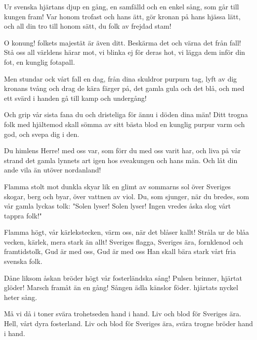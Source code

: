 \author{Text: Carl Vilhelm August Strandberg}


\songtext{}Ur svenska hjärtans djup en gång,
en samfälld och en enkel sång,
som går till kungen fram!
Var honom trofast och hans ätt,
gör kronan på hans hjässa lätt,
och all din tro till honom sätt,
du folk av frejdad stam!

O konung! folkets majestät
är även ditt. Beskärma det
och värna det från fall!
Stå oss all världens härar mot,
vi blinka ej för deras hot,
vi lägga dem inför din fot,
en kunglig fotapall.

Men stundar ock vårt fall en dag,
från dina skuldror purpurn tag,
lyft av dig kronans tvång
och drag de kära färger på,
det gamla gula och det blå,
och med ett svärd i handen gå
till kamp och undergång!

Och grip vår sista fana du
och dristeliga för ännu
i döden dina män!
Ditt trogna folk med hjältemod
skall sömma av sitt bästa blod
en kunglig purpur varm och god,
och svepa dig i den.

Du himlens Herre! med oss var,
som förr du med oss varit har,
och liva på vår strand
det gamla lynnets art igen
hos sveakungen och hans män.
Och låt din ande vila än
utöver nordanland!





\author{Text: Karl Gustav Ossiannilsson}

\songtext{}Flamma stolt mot dunkla skyar
lik en glimt av sommarns sol
över Sveriges skogar, berg och byar,
över vattnen av viol.
Du, som sjunger, när du bredes,
som vår gamla lyckas tolk:
"Solen lyser! Solen lyser!
Ingen vredes åska slog vårt tappra folk!"

Flamma högt, vår kärlekstecken,
värm oss, när det blåser kallt!
Stråla ur de blåa vecken,
kärlek, mera stark än allt!
Sveriges flagga, Sveriges ära,
fornklenod och framtidstolk,
Gud är med oss, Gud är med oss
Han skall bära stark vårt fria svenska folk.






\songtext{}Dåne liksom åskan bröder
högt vår fosterländska sång!
Pulsen brinner, hjärtat glöder!
Marsch framåt än en gång!
Sången ädla känslor föder.
hjärtats nyckel heter sång.

\leftrepeat Må vi då i toner svära
trohetseden hand i hand.
Liv och blod för Sveriges ära.
Hell, vårt dyra fosterland.
Liv och blod för Sveriges ära, svära
trogne bröder hand i hand. \rightrepeat




